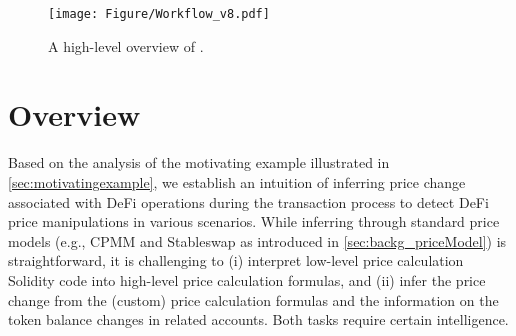 \begin{figure*}[t]
    \centering
    \texttt{[image: Figure/Workflow\_v8.pdf]}
    \vspace{-1ex}
    \caption{A high-level overview of \tool.}
    \label{fig:overview}
\end{figure*}

\vspace{-1.5ex}
\section{Overview}
\label{sec:overview}
\vspace{-0.5ex}

Based on the analysis of the motivating example illustrated in \mysec\ref{sec:motivatingexample}, we establish an intuition of inferring price change associated with DeFi operations during the transaction process to detect DeFi price manipulations in various scenarios.
While inferring through standard price models (e.g., CPMM and Stableswap as introduced in \mysec\ref{sec:backg_priceModel}) is straightforward, it is challenging to (i) interpret low-level price calculation Solidity code into high-level price calculation formulas, and (ii) infer the price change from the (custom) price calculation formulas and the information on the token balance changes in related accounts.
Both tasks require certain intelligence.

